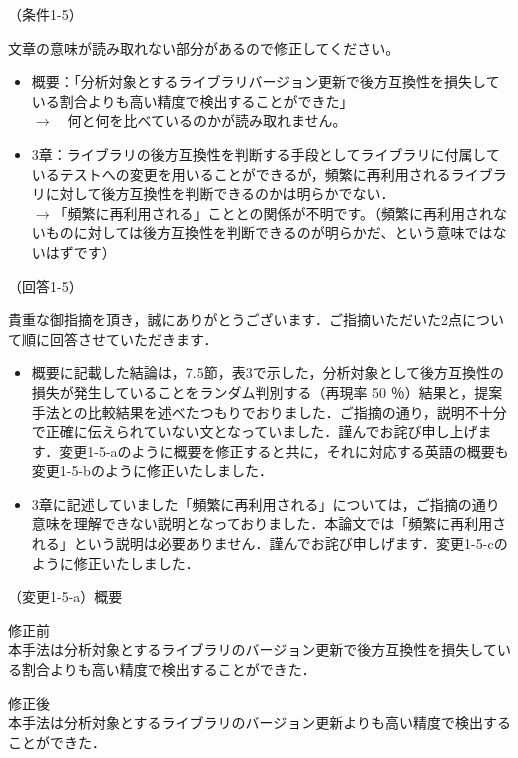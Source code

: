 \documentclass{jarticle} %
\def\subsection#1{ \vspace{1pc} {\gt #1} }
\begin{document}
\subsection{（条件1-5）}

文章の意味が読み取れない部分があるので修正してください。
\begin{itemize}
\item 概要：「分析対象とするライブラリバージョン更新で後方互換性を損失している割合よりも高い精度で検出することができた」\\
$\rightarrow$　何と何を比べているのかが読み取れません。
\item 3章：ライブラリの後方互換性を判断する手段としてライブラリに付属しているテストへの変更を用いることができるが，頻繁に再利用されるライブラリに対して後方互換性を判断できるのかは明らかでない．\\
$\rightarrow$「頻繁に再利用される」こととの関係が不明です。（頻繁に再利用されないものに対しては後方互換性を判断できるのが明らかだ、という意味ではないはずです）
\end{itemize}

\subsection{（回答1-5）}

貴重な御指摘を頂き，誠にありがとうございます．ご指摘いただいた2点について順に回答させていただきます．
\begin{itemize}
\item 概要に記載した結論は，7.5節，表3で示した，分析対象として後方互換性の損失が発生していることをランダム判別する（再現率 50 ％）結果と，提案手法との比較結果を述べたつもりでおりました．ご指摘の通り，説明不十分で正確に伝えられていない文となっていました．謹んでお詫び申し上げます．変更1-5-aのように概要を修正すると共に，それに対応する英語の概要も変更1-5-bのように修正いたしました．
\item 3章に記述していました「頻繁に再利用される」については，ご指摘の通り意味を理解できない説明となっておりました．本論文では「頻繁に再利用される」という説明は必要ありません．謹んでお詫び申しげます．変更1-5-cのように修正いたしました．
\end{itemize}



\subsection{（変更1-5-a）概要}
\vspace{-0.3cm}
\begin{description}
\item 修正前\\
\phantom{　}
本手法は分析対象とするライブラリのバージョン更新で後方互換性を損失している割合よりも高い精度で検出することができた．
\vspace{-0.3cm}
\item 修正後\\
\phantom{　}
本手法は分析対象とするライブラリのバージョン更新\textcolor{red}{}よりも高い精度で検出することができた．
\end{description}
\end{document}
